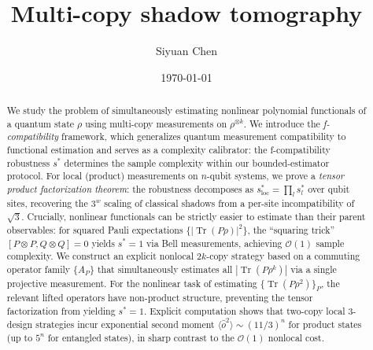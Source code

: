 \documentclass[aps,%
twocolumn,%
floatfix,%
pra,%
amsfonts,%
groupedaddress,%
superscriptaddress]{revtex4-2}%
\DeclareMathOperator{\tr}{Tr}
\newcommand{\ox}{\otimes}
\newcommand{\1}{\mathbbm{1}}
\begin{document}
\title{Multi-copy shadow tomography}
\author{Siyuan Chen}
%
%
\begin{abstract}
\noindent
We study the problem of simultaneously estimating nonlinear polynomial functionals of a quantum state $\rho$ using multi-copy measurements on $\rho^{\ox k}$.
We introduce the \emph{f-compatibility} framework, which generalizes quantum measurement compatibility to functional estimation and serves as a complexity calibrator:
the f-compatibility robustness $s^*$ determines the sample complexity within our bounded-estimator protocol.
For local (product) measurements on $n$-qubit systems, we prove a \emph{tensor product factorization theorem}: the robustness decomposes as $s^*_{\mathrm{loc}} = \prod_l s^*_l$ over qubit sites, recovering the $3^w$ scaling of classical shadows from a per-site incompatibility of $\sqrt{3}$.
Crucially, nonlinear functionals can be strictly easier to estimate than their parent observables: for squared Pauli expectations $\{|\tr(P\rho)|^2\}$, the ``squaring trick'' $[P\ox P, Q\ox Q] = 0$ yields $s^* = 1$ via Bell measurements, achieving $\mathcal{O}(1)$ sample complexity.
We construct an explicit nonlocal $2k$-copy strategy based on a commuting operator family $\{A_P\}$ that simultaneously estimates all $|\tr(P\rho^k)|$ via a single projective measurement.
\color{red}For the nonlinear task of estimating $\{\tr(P\rho^2)\}_P$, the relevant lifted operators have non-product structure, preventing the tensor factorization from yielding $s^*=1$. Explicit computation shows that two-copy local 3-design strategies incur exponential second moment $\langle\hat{o}^2\rangle \sim (11/3)^n$ for product states (up to $5^n$ for entangled states), in sharp contrast to the $\mathcal{O}(1)$ nonlocal cost.\color{black}
\end{abstract}
\date{\today}
\maketitle
\end{document}
